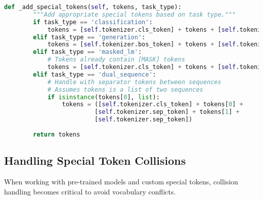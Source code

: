 \begin{lstlisting}[language=Python, caption=Special token-aware encoding pipeline]
    def _add_special_tokens(self, tokens, task_type):
        """Add appropriate special tokens based on task type."""
        if task_type == 'classification':
            tokens = [self.tokenizer.cls_token] + tokens + [self.tokenizer.sep_token]
        elif task_type == 'generation':
            tokens = [self.tokenizer.bos_token] + tokens + [self.tokenizer.eos_token]
        elif task_type == 'masked_lm':
            # Tokens already contain [MASK] tokens
            tokens = [self.tokenizer.cls_token] + tokens + [self.tokenizer.sep_token]
        elif task_type == 'dual_sequence':
            # Handle with separator tokens between sequences
            # Assumes tokens is a list of two sequences
            if isinstance(tokens[0], list):
                tokens = ([self.tokenizer.cls_token] + tokens[0] + 
                         [self.tokenizer.sep_token] + tokens[1] + 
                         [self.tokenizer.sep_token])
        
        return tokens
\end{lstlisting}

\subsection{Handling Special Token Collisions}

When working with pre-trained models and custom special tokens, collision handling becomes critical to avoid vocabulary conflicts.

